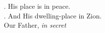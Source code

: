 \begin{Parallel}[v]{\colw}{\colx}
{}
{\vern
{\noindent
\Vbar. His place is in peace.\\
\Rbar. And His dwelling-place in Zion.\\
Our Father, \textit{in secret}}}

\end{Parallel}



